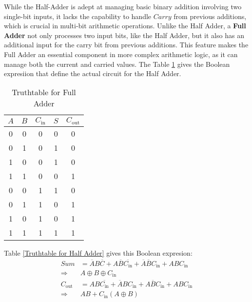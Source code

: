 While the Half-Adder is adept at managing basic binary addition involving two single-bit inputs, it lacks the capability to handle $Carry$ from previous additions, which is crucial in multi-bit arithmetic operations.
Unlike the Half Adder, a \textbf{Full Adder} not only processes two input bits, like the Half Adder, but it also has an additional input for the carry bit from previous additions. This feature makes the Full Adder an essential component in more complex arithmetic logic, as it can manage both the current and carried values. The Table \ref{Truthtable for Full Adder} gives the Boolean expresiion that define the actual circuit for the Half Adder. 
\begin{table}[H]
    \centering
    \caption{Truthtable for Full Adder} \label{Truthtable for Full Adder}
    \begin{tabular}{|c|c|c|c|c|}
        \hline
        \(A\) & \(B\) & \(C_{\text{in}}\) & \(S\) & \(C_{\text{out}}\) \\
        \hline
        0 & 0 & 0 & 0 & 0 \\
        0 & 1 & 0 & 1 & 0 \\
        1 & 0 & 0 & 1 & 0 \\
        1 & 1 & 0 & 0 & 1 \\
        0 & 0 & 1 & 1 & 0 \\
        0 & 1 & 1 & 0 & 1 \\
        1 & 0 & 1 & 0 & 1 \\
        1 & 1 & 1 & 1 & 1 \\
        \hline
    \end{tabular}
    
\end{table}
Table \ref{Truthtable for Half Adder} gives this Boolean expresion:
\begin{equation}
    \begin{aligned}
        Sum&=\overline{A}B\overline{C}+A\overline{B}\overline{C_{\text{in}}}+\overline{A}\overline{B}C_{\text{in}}+ABC_{\text{in}}\\
        \Rightarrow&A\oplus B\oplus C_{\text{in}}\\
        C_{\text{out}}&=AB\overline{C_{\text{in}}}+\overline{A}BC_{\text{in}}+A\overline{B}C_{\text{in}}+ABC_{\text{in}}\\ 
        \Rightarrow&AB+C_{\text{in}}(A\oplus B)\\
    \end{aligned}
\end{equation}


